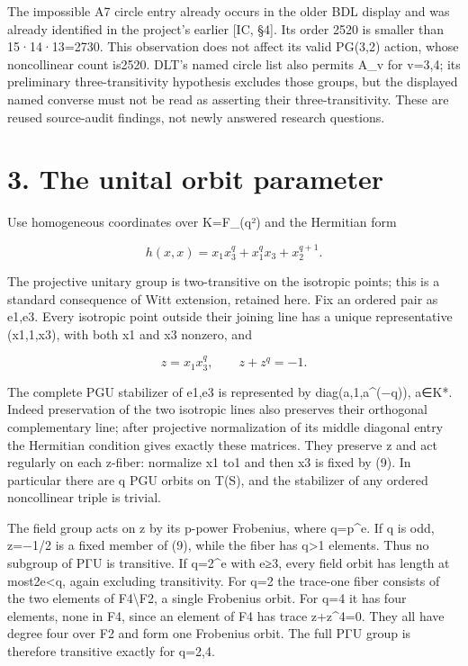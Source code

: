 \documentclass[
  11pt,
  a4paper,
]{article}
\newcounter{none} %
\begin{document}
The impossible A7 circle entry already occurs in the older BDL display
and was already identified in the project's earlier {[}IC, §4{]}. Its
order 2520 is smaller than 15·14·13=2730. This observation does not
affect its valid PG(3,2) action, whose noncollinear count is2520. DLT's
named circle list also permits A\_v for v=3,4; its preliminary
three-transitivity hypothesis excludes those groups, but the displayed
named converse must not be read as asserting their three-transitivity.
These are reused source-audit findings, not newly answered research
questions.

\section{3. The unital orbit
parameter}\label{the-unital-orbit-parameter}

Use homogeneous coordinates over K=F\_(q²) and the Hermitian form

\[
 h(x,x)=x_1x_3^q+x_1^qx_3+x_2^{q+1}.
\]

The projective unitary group is two-transitive on the isotropic points;
this is a standard consequence of Witt extension, retained here. Fix an
ordered pair as e1,e3. Every isotropic point outside their joining line
has a unique representative (x1,1,x3), with both x1 and x3 nonzero, and

\[
 z=x_1x_3^q,\qquad z+z^q=-1.
\tag{9}
\]

The complete PGU stabilizer of e1,e3 is represented by
diag(a,1,a\^{}(−q)), a∈K*. Indeed preservation of the two isotropic
lines also preserves their orthogonal complementary line; after
projective normalization of its middle diagonal entry the Hermitian
condition gives exactly these matrices. They preserve z and act
regularly on each z-fiber: normalize x1 to1 and then x3 is fixed by (9).
In particular there are q PGU orbits on T(S), and the stabilizer of any
ordered noncollinear triple is trivial.

The field group acts on z by its p-power Frobenius, where q=p\^{}e. If q
is odd, z=−1/2 is a fixed member of (9), while the fiber has
q\textgreater1 elements. Thus no subgroup of PΓU is transitive. If
q=2\^{}e with e≥3, every field orbit has length at most2e\textless q,
again excluding transitivity. For q=2 the trace-one fiber consists of
the two elements of F4\textbackslash F2, a single Frobenius orbit. For
q=4 it has four elements, none in F4, since an element of F4 has trace
z+z\^{}4=0. They all have degree four over F2 and form one Frobenius
orbit. The full PΓU group is therefore transitive exactly for q=2,4.
\end{document}
